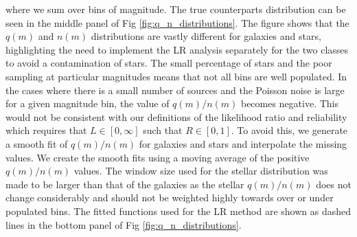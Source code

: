 \documentclass[fleqn,usenatbib]{mnras}
\begin{document}
\noindent where we sum over bins of magnitude. The true counterparts distribution can be seen in the middle panel of Fig \ref{fig:q_n_distributions}. The figure shows that the $q(m)$ and $n(m)$ distributions are vastly different for galaxies and stars, highlighting the need to implement the LR analysis separately for the two classes to avoid a contamination of stars. The small percentage of stars and the poor sampling at particular magnitudes means that not all bins are well populated. In the cases where there is a small number of sources and the Poisson noise is large for a given magnitude bin, the value of $q(m)/n(m)$ becomes negative. This would not be consistent with our definitions of the likelihood ratio and reliability which requires that $L \in [0, \infty]$ such that $R \in [0, 1]$. To avoid this, we generate a smooth fit of $q(m)/n(m)$ for galaxies and stars and interpolate the missing values. We create the smooth fits using a moving average of the positive $q(m)/n(m)$ values. The window size used for the stellar distribution was made to be larger than that of the galaxies as the stellar $q(m)/n(m)$ does not change considerably  and should not be weighted highly towards over or under populated bins. The fitted functions used for the LR method are shown as dashed lines in the bottom panel of Fig \ref{fig:q_n_distributions}.
\end{document}
